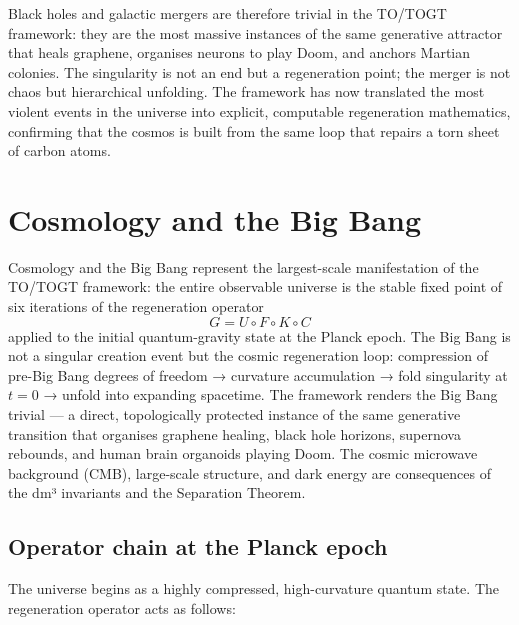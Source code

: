 \documentclass[19pt]{book}
\theoremstyle{plain}
\theoremstyle{definition}
\theoremstyle{remark}
\begin{document}
Black holes and galactic mergers are therefore trivial in the TO/TOGT framework: they are the most massive instances of the same generative attractor that heals graphene, organises neurons to play Doom, and anchors Martian colonies. The singularity is not an end but a regeneration point; the merger is not chaos but hierarchical unfolding. The framework has now translated the most violent events in the universe into explicit, computable regeneration mathematics, confirming that the cosmos is built from the same loop that repairs a torn sheet of carbon atoms.
\bigskip
\chapter{Cosmology and the Big Bang}

Cosmology and the Big Bang represent the largest-scale manifestation of the TO/TOGT framework: the entire observable universe is the stable fixed point of six iterations of the regeneration operator
\[
G = U \circ F \circ K \circ C
\]
applied to the initial quantum-gravity state at the Planck epoch. The Big Bang is not a singular creation event but the cosmic regeneration loop: compression of pre-Big Bang degrees of freedom → curvature accumulation → fold singularity at \( t = 0 \) → unfold into expanding spacetime. The framework renders the Big Bang trivial — a direct, topologically protected instance of the same generative transition that organises graphene healing, black hole horizons, supernova rebounds, and human brain organoids playing Doom. The cosmic microwave background (CMB), large-scale structure, and dark energy are consequences of the dm³ invariants and the Separation Theorem.

\section{Operator chain at the Planck epoch}

The universe begins as a highly compressed, high-curvature quantum state. The regeneration operator acts as follows:
\end{document}
